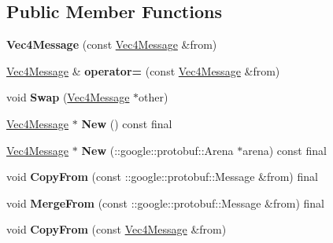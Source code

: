 \subsection*{Public Member Functions}
\begin{DoxyCompactItemize}
\item 
\mbox{\label{classtbMath_1_1Vec4Message_abde37ecad350aa8d9c6a7096a5d25538}} 
{\bfseries Vec4\+Message} (const \hyperlink{classtbMath_1_1Vec4Message}{Vec4\+Message} \&from)
\item 
\mbox{\label{classtbMath_1_1Vec4Message_a0ef04a65347b9ed31f9bff2bb4d45431}} 
\hyperlink{classtbMath_1_1Vec4Message}{Vec4\+Message} \& {\bfseries operator=} (const \hyperlink{classtbMath_1_1Vec4Message}{Vec4\+Message} \&from)
\item 
\mbox{\label{classtbMath_1_1Vec4Message_a6230fe0fd414e815884f9bfd98b5457d}} 
void {\bfseries Swap} (\hyperlink{classtbMath_1_1Vec4Message}{Vec4\+Message} $\ast$other)
\item 
\mbox{\label{classtbMath_1_1Vec4Message_a72edd761e84e16fb8ef76def189b402b}} 
\hyperlink{classtbMath_1_1Vec4Message}{Vec4\+Message} $\ast$ {\bfseries New} () const final
\item 
\mbox{\label{classtbMath_1_1Vec4Message_aa09b3817e2934c282545a1a2f76cd353}} 
\hyperlink{classtbMath_1_1Vec4Message}{Vec4\+Message} $\ast$ {\bfseries New} (\+::google\+::protobuf\+::\+Arena $\ast$arena) const final
\item 
\mbox{\label{classtbMath_1_1Vec4Message_ac45ffadc6b7507e7f91b8f8f06e615e8}} 
void {\bfseries Copy\+From} (const \+::google\+::protobuf\+::\+Message \&from) final
\item 
\mbox{\label{classtbMath_1_1Vec4Message_a726f281b5835cd60765210520c891167}} 
void {\bfseries Merge\+From} (const \+::google\+::protobuf\+::\+Message \&from) final
\item 
\mbox{\label{classtbMath_1_1Vec4Message_af0459319067b6bbf8b2cee4e42c59f7a}} 
void {\bfseries Copy\+From} (const \hyperlink{classtbMath_1_1Vec4Message}{Vec4\+Message} \&from)

\end{DoxyCompactItemize}
